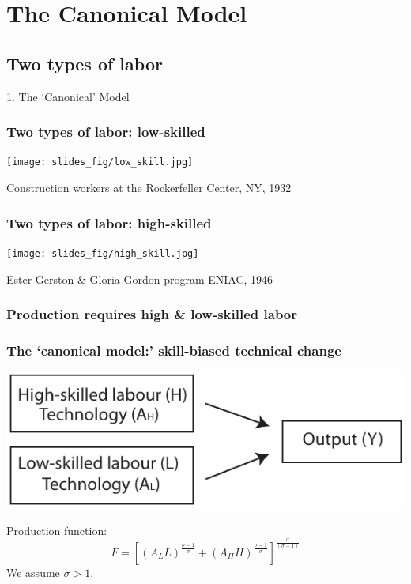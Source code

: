 \documentclass[red]{beamer}
\begin{document}
\section{The Canonical Model}
 \subsection{Two types of labor}
\begin{frame}[c]
\begin{center}
  1. The `Canonical' Model
\end{center}
\end{frame}

\begin{frame}[c]
\frametitle{Two types of labor: low-skilled}
\begin{center}
  \texttt{[image: slides\_fig/low\_skill.jpg]}
\end{center}
Construction workers at the Rockerfeller Center, NY, 1932
\end{frame}

\begin{frame}[c]
\frametitle{Two types of labor: high-skilled}
\begin{center}
  \texttt{[image: slides\_fig/high\_skill.jpg]}
\end{center}
Ester Gerston \& Gloria Gordon program ENIAC, 1946
\end{frame}

\begin{frame}[c]
\frametitle{Production requires high \& low-skilled labor}
\begin{center}
  \vspace{-10pt}
\end{center}
\end{frame}

\begin{frame}[c]
\frametitle{The `canonical model:' skill-biased technical change}
\begin{center}
  \includegraphics[width=\textwidth]{slides_fig/CES.pdf}
\end{center}
Production function:
\begin{equation*}
  \label{eq:cobbdoug}
  F = \left[\left(A_LL\right)^{\frac{\sigma - 1}{\sigma}}
            + \left(A_HH\right)^{\frac{\sigma - 1}{\sigma}}
          \right]^\frac{\sigma}{(\sigma-1)}
\end{equation*}
We assume $\sigma>1$.
\end{frame}
\end{document}
